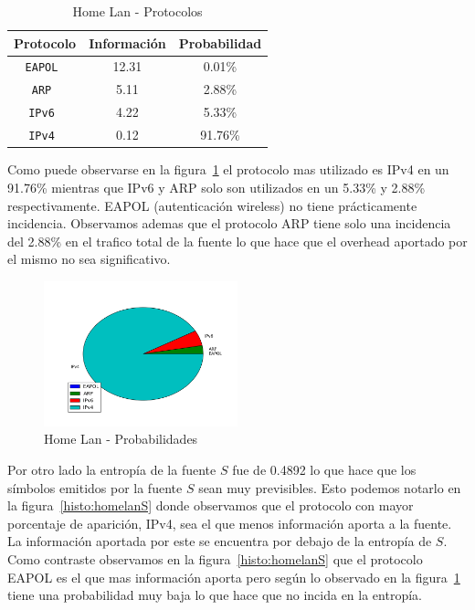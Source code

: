 \documentclass[final,inline,narroweqnarray,a4paper]{ieee}
\begin{document}
\begin{table}[H]
    \begin{center}
        \begin{tabular}{|c|c|c|}
            \hline
            \textbf{Protocolo} & \textbf{Información} & \textbf{Probabilidad} \\ \hline
            \texttt{EAPOL     }& 12.31       & 0.01\%     \\ \hline
            \texttt{ARP       }& 5.11        & 2.88\%     \\ \hline
            \texttt{IPv6      }& 4.22        & 5.33\%     \\ \hline
            \texttt{IPv4      }& 0.12        & 91.76\%    \\ \hline
        \end{tabular}
        \caption{Home Lan - Protocolos}
        \label{table:homelanS}
    \end{center}
\end{table}

Como puede observarse en la figura~\ref{torta:homelanS} el protocolo mas utilizado es IPv4 en un 91.76\% mientras que IPv6 y ARP solo son utilizados en un 5.33\% y 2.88\% respectivamente. EAPOL (autenticación wireless) no tiene prácticamente incidencia.
Observamos ademas que el protocolo ARP tiene solo una incidencia del 2.88\% en el trafico total de la fuente lo que hace que el overhead aportado por el mismo no sea significativo. 

\begin{figure}[H]
    \begin{center}
        \includegraphics[width=0.5\textwidth]{plot/homelanS-pie.png}
        \caption{Home Lan - Probabilidades}
        \label{torta:homelanS}
    \end{center}
\end{figure}

Por otro lado la entropía de la fuente $S$ fue de 0.4892 lo que hace que los símbolos emitidos por la fuente $S$ sean muy previsibles. Esto podemos notarlo en la figura~\ref{histo:homelanS} donde observamos que el protocolo con mayor porcentaje de aparición, IPv4,  sea el que menos información aporta a la fuente. La información aportada por este se encuentra por debajo de la entropía de $S$. Como contraste observamos en la figura~\ref{histo:homelanS} que el protocolo EAPOL es el que mas información aporta pero según lo observado en la figura~\ref{torta:homelanS} tiene una probabilidad muy baja lo que hace que no incida en la entropía.
\end{document}
